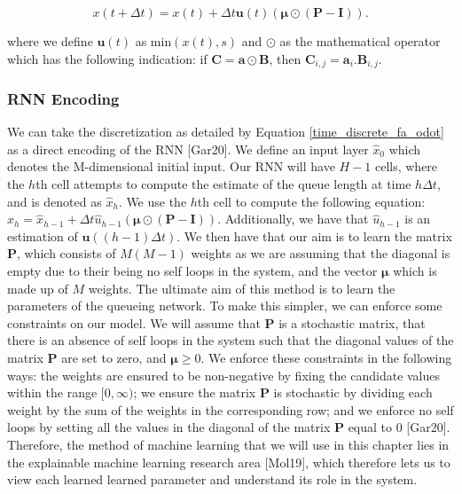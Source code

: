 \documentclass[a4paper,11pt,titlepage]{article}
\begin{document}
\begin{equation}
    x(t + \Delta t) = x(t) + \Delta t \mathbf{u}(t) (\bm{\mu} \odot (\mathbf{P} - \mathbf{I})).
    \label{time_discrete_fa_odot}
\end{equation}

where we define $\mathbf{u}(t)$ as $\text{min} (x(t),s)$ and $\odot$ as the mathematical operator which has the following indication: if $\mathbf{C} = \mathbf{a} \odot \mathbf{B}$, then $\mathbf{C}_{i,j} = \mathbf{a}_i . \mathbf{B}_{i,j}$. 

\subsubsection{RNN Encoding}

We can take the discretization as detailed by Equation \ref{time_discrete_fa_odot} as a direct encoding of the RNN [Gar20]. We define an input layer $\hat{x}_0$ which denotes the M-dimensional initial input. Our RNN will have $H-1$ cells, where the $h$th cell attempts to compute the estimate of the queue length at time $h \Delta t$, and is denoted as $\hat{x}_h$. We use the $h$th cell to compute the following equation: $\hat{x}_h = \hat{x}_{h-1} + \Delta t \hat{u}_{h-1} (\bm{\mu} \odot (\mathbf{P}-\mathbf{I}))$. Additionally, we have that $\hat{u}_{h-1}$ is an estimation of $\mathbf{u}((h-1)\Delta t)$. We then have that our aim is to learn the matrix $\mathbf{P}$, which consists of $M(M-1)$ weights as we are assuming that the diagonal is empty due to their being no self loops in the system, and the vector $\bm{\mu}$ which is made up of $M$ weights. The ultimate aim of this method is to learn the parameters of the queueing network. To make this simpler, we can enforce some constraints on our model. We will assume that $\mathbf{P}$ is a stochastic matrix, that there is an absence of self loops in the system such that the diagonal values of the matrix $\mathbf{P}$ are set to zero, and $\bm{\mu} \geq 0$. We enforce these constraints in the following ways: the weights are ensured to be non-negative by fixing the candidate values within the range $[0,\infty)$; we ensure the matrix $\mathbf{P}$ is stochastic by dividing each weight by the sum of the weights in the corresponding row; and we enforce no self loops by setting all the values in the diagonal of the matrix $\mathbf{P}$ equal to 0 [Gar20]. \\

Therefore, the method of machine learning that we will use in this chapter lies in the explainable machine learning research area [Mol19], which therefore lets us to view each learned learned parameter and understand its role in the system. \\
\end{document}
